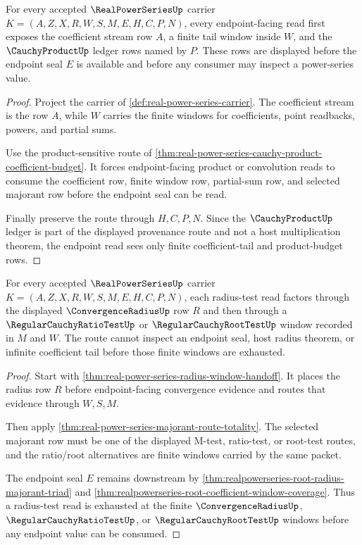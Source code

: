 \begin{theorem}
\label{thm:real-power-series-coefficient-tail-obligations}
For every accepted $\RealPowerSeriesUp$ carrier $K=(A,Z,X,R,W,S,M,E,H,C,P,N)$, every endpoint-facing read first exposes the coefficient stream row $A$, a finite tail window inside $W$, and the $\CauchyProductUp$ ledger rows named by $P$. These rows are displayed before the endpoint seal $E$ is available and before any consumer may inspect a power-series value.
\end{theorem}
\begin{proof}
Project the carrier of \autoref{def:real-power-series-carrier}. The coefficient stream is the row $A$, while $W$ carries the finite windows for coefficients, point readbacks, powers, and partial sums.

Use the product-sensitive route of \autoref{thm:real-power-series-cauchy-product-coefficient-budget}. It forces endpoint-facing product or convolution reads to consume the coefficient row, finite window row, partial-sum row, and selected majorant row before the endpoint seal can be read.

Finally preserve the route through $H,C,P,N$. Since the $\CauchyProductUp$ ledger is part of the displayed provenance route and not a host multiplication theorem, the endpoint read sees only finite coefficient-tail and product-budget rows.
\end{proof}

\begin{theorem}
\label{thm:real-power-series-radius-test-window-exhaustion}
For every accepted $\RealPowerSeriesUp$ carrier $K=(A,Z,X,R,W,S,M,E,H,C,P,N)$, each radius-test read factors through the displayed $\ConvergenceRadiusUp$ row $R$ and then through a $\RegularCauchyRatioTestUp$ or $\RegularCauchyRootTestUp$ window recorded in $M$ and $W$. The route cannot inspect an endpoint seal, host radius theorem, or infinite coefficient tail before those finite windows are exhausted.
\end{theorem}
\begin{proof}
Start with \autoref{thm:real-power-series-radius-window-handoff}. It places the radius row $R$ before endpoint-facing convergence evidence and routes that evidence through $W,S,M$.

Then apply \autoref{thm:real-power-series-majorant-route-totality}. The selected majorant row must be one of the displayed M-test, ratio-test, or root-test routes, and the ratio/root alternatives are finite windows carried by the same packet.

The endpoint seal $E$ remains downstream by \autoref{thm:realpowerseries-root-radius-majorant-triad} and \autoref{thm:realpowerseries-root-coefficient-window-coverage}. Thus a radius-test read is exhausted at the finite $\ConvergenceRadiusUp$, $\RegularCauchyRatioTestUp$, or $\RegularCauchyRootTestUp$ windows before any endpoint value can be consumed.
\end{proof}

